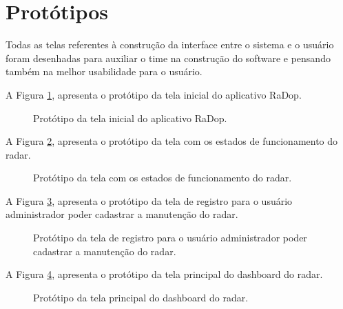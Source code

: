 \section{Protótipos}

Todas as telas referentes à construção da interface entre o sistema e o usuário foram desenhadas para auxiliar o time na construção do software e pensando também na melhor usabilidade para o usuário.

A Figura \ref{fig:tela_inicial}, apresenta o protótipo da tela inicial do aplicativo RaDop.

\begin{figure}[H]
	\caption{\label{fig:tela_inicial} Protótipo da tela inicial do aplicativo RaDop.}
\end{figure}

A Figura \ref{fig:tela_status}, apresenta o protótipo da tela com os estados de funcionamento do radar.

\begin{figure}[H]
	\caption{\label{fig:tela_status} Protótipo da tela com os estados de funcionamento do radar.}
\end{figure}

A Figura \ref{fig:tela_registro}, apresenta o protótipo da tela de registro para o usuário administrador poder cadastrar a manutenção do radar.

\begin{figure}[H]
	\caption{\label{fig:tela_registro} Protótipo da tela de registro para o usuário administrador poder cadastrar a manutenção do radar.}
\end{figure}

A Figura \ref{fig:tela_dashboard}, apresenta o protótipo da tela principal do dashboard do radar.

\begin{figure}[H]
	\caption{\label{fig:tela_dashboard} Protótipo da tela principal do dashboard do radar.}
\end{figure}

\pagebreak
